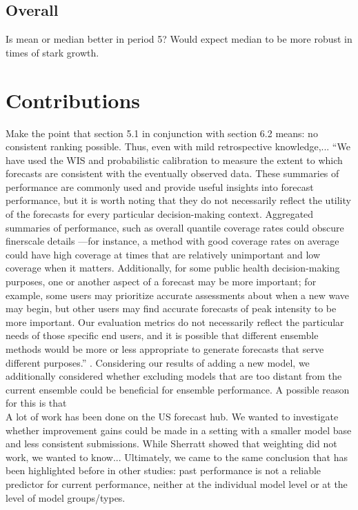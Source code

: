 \subsection{Overall}
Is mean or median better in period 5? Would expect median to be more robust in times of stark growth.
\section{Contributions}
Make the point that section 5.1 in conjunction with section 6.2 means: no consistent ranking possible.
Thus, even with mild retrospective knowledge,...
``We have used the WIS and probabilistic calibration to measure the extent to which forecasts
are consistent with the eventually observed data. These summaries of performance are commonly
used and provide useful insights into forecast performance, but it is worth noting that they do
not necessarily reflect the utility of the forecasts for every particular decision-making context.
Aggregated summaries of performance, such as overall quantile coverage rates could obscure finerscale
details —for instance, a method with good coverage rates on average could have high coverage
at times that are relatively unimportant and low coverage when it matters. Additionally, for some
public health decision-making purposes, one or another aspect of a forecast may be more important;
for example, some users may prioritize accurate assessments about when a new wave may begin,
but other users may find accurate forecasts of peak intensity to be more important. Our evaluation
metrics do not necessarily reflect the particular needs of those specific end users, and it is possible
that different ensemble methods would be more or less appropriate to generate forecasts that serve
different purposes.'' \citep{ray_comparing_2022}.
Considering our results of adding a new model, we additionally considered whether excluding models that are too distant from the current ensemble could be beneficial for ensemble performance. A possible reason for this is that  \\
A lot of work has been done on the US forecast hub. We wanted to investigate whether improvement gains could be made in a setting with a smaller model base and less consistent submissions. While Sherratt showed that weighting did not work, we wanted to know... Ultimately, we came to the same conclusion that has been highlighted before in other studies: past performance is not a reliable predictor for current performance, neither at the individual model level or at the level of model groups/types. \\

